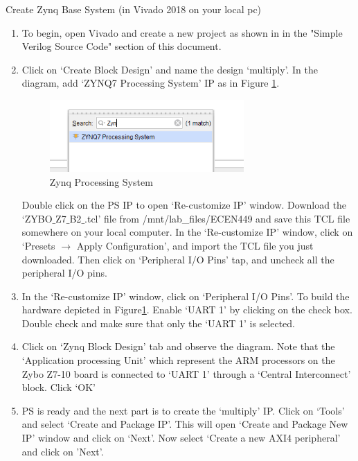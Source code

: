 \documentclass[11pt,twoside,titlepage]{article}
\begin{document}
\noindent
Create Zynq Base System (in Vivado 2018 on your local pc)
\begin{enumerate}
	
	\item To begin, open Vivado and create a new project as shown in  in the "Simple Verilog Source Code" section of this document.
	
	\item Click on `Create Block Design' and name the design `multiply'. In the diagram, add `ZYNQ7 Processing System' IP as in Figure \ref{zynq}.
	
	\begin{figure}[!h]
		\begin{center}
			\includegraphics[width=0.7\textwidth]{zynq}
			\caption{Zynq Processing System}
			\label{zynq}
		\end{center}
	\end{figure}

	Double click on the PS IP to open `Re-customize IP' window. 
	Download the `ZYBO$\_$Z7$\_$B2$\_$.tcl' file 
	from /mnt/lab\_files/ECEN449 and save this TCL 
	file somewhere on your local computer. 
	In the `Re-customize IP' window, click on `Presets $\rightarrow$ Apply Configuration', 
	and import the TCL file you just downloaded. 
	Then click on `Peripheral I/O Pins' tap, and uncheck all the peripheral I/O pins.
	
	\item In the `Re-customize IP' window, click on `Peripheral I/O Pins'. To build the hardware depicted in Figure\ref{zynq}. Enable `UART 1' by clicking on the check box. Double check and make sure that only the `UART 1' is selected.
	
	\item Click on `Zynq Block Design' tab and observe the diagram. Note that the `Application processing Unit' which represent the ARM processors on the Zybo Z7-10 board is connected to `UART 1' through a `Central Interconnect' block. Click `OK'
	
	\item PS is ready and the next part is to create the `multiply' IP. Click on `Tools' and select `Create and Package IP'. This will open `Create and Package New IP' window  and click on  `Next'. Now select `Create a new AXI4 peripheral' and click on 'Next'.
	

\end{enumerate}
\end{document}
